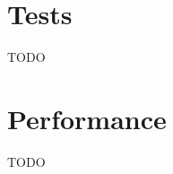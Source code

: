 \documentclass[../main.tex]{subfiles}
\begin{document}
\section{Tests}\label{section_implem_tests}
TODO

\section{Performance}\label{section_implem_perf}
TODO
\end{document}

